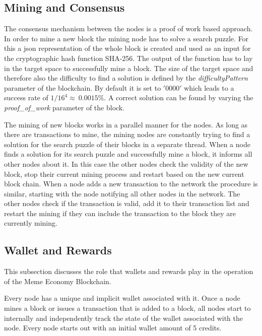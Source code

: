 \documentclass[12pt]{article}
\begin{document}
\subsection{Mining and Consensus} %

The consensus mechanism between the nodes is a proof of work based approach. In order to mine a new block the mining node has to solve a search puzzle. For this a json representation of the whole block is created and used as an input for the cryptographic hash function SHA-256. The output of the function has to lay in the target space to successfully mine a block. 
The size of the target space and therefore also the difficulty to find a solution is defined by the \textit{difficultyPattern} parameter of the blockchain. 
By default it is set to $'0000'$ which leads to a success rate of $1/16^4\approx~0.0015\%$. 
A correct solution can be found by varying the \textit{proof\_of\_work} parameter of the block.

The mining of new blocks works in a parallel manner for the nodes. As long as there are transactions to mine, the mining nodes are constantly trying to find a solution for the search puzzle of their blocks in a separate thread. When a node finds a solution for its search puzzle and successfully mine a block, it informs all other nodes about it. In this case the other nodes check the validity of the new block, stop their current mining process and restart based on the new current block chain. When a node adds a new transaction to the network the procedure is similar, starting with the node notifying all other nodes in the network. The other nodes check if the transaction is valid, add it to their transaction list and restart the mining if they can include the transaction to the block they are currently mining.


\subsection{Wallet and Rewards} %

This subsection discusses the role that wallets and rewards play in the operation of the Meme Economy Blockchain.

Every node has a unique and implicit wallet associated with it. Once a node mines a block or issues a transaction that is added to a block, all nodes start to internally and independently track the state of the wallet associated with the node. Every node starts out with an initial wallet amount of 5 credits. %
\end{document}
